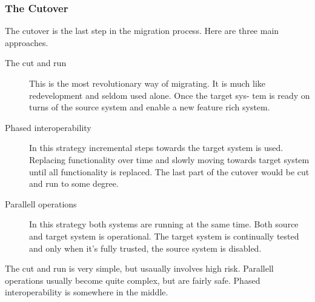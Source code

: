 \subsubsection{The Cutover}
The cutover is the last step in the migration process. 
Here are three main approaches.

\begin{description}
\item[The cut and run] This is the most revolutionary way of migrating. It is
much like redevelopment and seldom used alone. Once the target sys-
tem is ready on turns of the source system and enable a new feature
rich system.

\item[Phased interoperability] In this strategy incremental steps towards the
target system is used. Replacing functionality over time and slowly
moving towards target system until all functionality is replaced. The
last part of the cutover would be cut and run to some degree.

\item[Parallell operations] In this strategy both systems are running at the same
time. Both source and target system is operational. The target system
is continually tested and only when it's fully trusted, the source system
is disabled.
\end{description}

The cut and run is very simple, but usaually involves high risk. Parallell
operations usually become quite complex, but are fairly safe. Phased interoperability is somewhere in the middle.

\cite{leg:jdbj}


